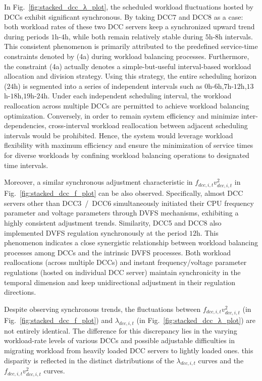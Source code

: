 \documentclass[lettersize,journal]{IEEEtran}
\begin{document}
In Fig.~\ref{fig:stacked_dcc_λ_plot}, the scheduled workload fluctuations hosted by DCCs exhibit significant synchronous. By taking DCC7 and DCC8 as a case: both workload rates of these two DCC servers keep a synchronized upward trend during periods $1$h-$4$h, while both remain relatively stable during $5$h-$8$h intervals. This consistent phenomenon is primarily attributed to the predefined service-time constraints denoted by (4a) during workload balancing processes.
Furthermore, the constraint (4a) actually denotes a simple-but-useful interval-based workload allocation and division strategy. Using this strategy, the entire scheduling horizon ($24$h) is segmented into a series of independent intervals such as $0$h-$6$h,$7$h-$12$h,$13$h-$18$h,$19$h-$24$h. Under each independent scheduling interval, the workload reallocation across multiple DCCs are permitted to achieve workload balancing optimization. Conversely, in order to remain system efficiency and minimize inter-dependencies, cross-interval workload reallocation between adjacent scheduling intervals would be prohibited. 
Hence, the system would leverage workload flexibility with maximum efficiency and ensure the minimization of service times for diverse workloads by confining workload balancing operations to designated time intervals.

Moreover, a similar synchronous adjustment characteristic in \(f_{dcc,i,t} v_{dcc,i,t}^2\) in Fig.~\ref{fig:stacked_dcc_f_plot} can be also observed. Specifically, almost DCC servers other than DCC3~/~DCC6 simultaneously initiated their CPU frequency parameter and voltage parameters through DVFS mechanisms, exhibiting a highly consistent adjustment trends. Similarity, DCC5 and DCC8 also implemented DVFS regulation synchronously at the period $12$h. This phenomenon indicates a close synergistic relationship between workload balancing processes among DCCs and the intrinsic DVFS processes. Both workload reallocations (across multiple DCCs) and instant frequency/voltage parameter regulations (hosted on individual DCC server) maintain synchronicity in the temporal dimension and keep unidirectional adjustment in their regulation directions.

Despite observing synchronous trends, the fluctuations between \(f_{dcc,i,t} v_{dcc,i,t}^2\) (in Fig.~\ref{fig:stacked_dcc_f_plot}) and \(\lambda_{dcc,i,t}\) (in Fig.~\ref{fig:stacked_dcc_λ_plot}) are not entirely identical. The difference for this discrepancy lies in the varying workload-rate levels of various DCCs and possible adjustable difficulties in migrating workload from heavily loaded DCC servers to lightly loaded ones.
this disparity is reflected in the distinct distributions of the \(\lambda_{dcc,i,t}\) curves and the \(f_{dcc,i,t} v_{dcc,i,t}^2\) curves.
\end{document}
